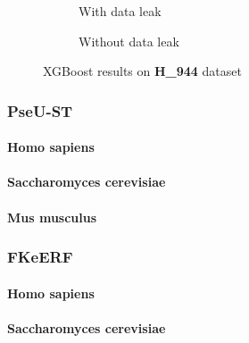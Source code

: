         \begin{figure}[H]
            \centering
            \begin{subfigure}{0.47\textwidth}
              \centering
              \resizebox{\textwidth}{!}{}
              \captionsetup{justification=centering}
              \caption{With data leak}
            \end{subfigure}%
            \hspace{0.05\textwidth}
            \begin{subfigure}{0.47\textwidth}
              \centering
              \resizebox{\textwidth}{!}{}
              \captionsetup{justification=centering}
              \caption{Without data leak}
            \end{subfigure}
            \caption{XGBoost results on \textbf{H\_944} dataset}\label{fig:porpoise_m944}
        \end{figure}

    \subsubsection{PseU-ST \cite{zhang_pseu-st_2023}}

      \paragraph{Homo sapiens}

      \paragraph{Saccharomyces cerevisiae}

      \paragraph{Mus musculus}

    \subsubsection{FKeERF \cite{chen_fuzzy_2024}}

      \paragraph{Homo sapiens}

      \paragraph{Saccharomyces cerevisiae}

